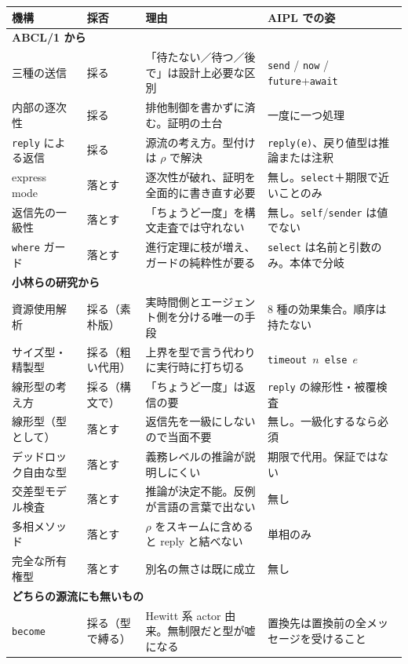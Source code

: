 \documentclass[11pt,a4paper]{ltjsarticle}
\theoremstyle{definition}
\theoremstyle{remark}
\begin{document}
\begin{center}
\small
\begin{longtable}{p{}p{}p{}p{}}
\toprule
機構 & 採否 & 理由 & AIPL での姿 \\
\midrule
\endhead
\multicolumn{4}{l}{\textbf{ABCL/1 から}}\\
\midrule
三種の送信 & 採る & 「待たない／待つ／後で」は設計上必要な区別 &
  \texttt{send} / \texttt{now} / \texttt{future}+\texttt{await} \\
内部の逐次性 & 採る & 排他制御を書かずに済む。証明の土台 & 一度に一つ処理 \\
\texttt{reply} による返信 & 採る & 源流の考え方。型付けは $\rho$ で解決 &
  \texttt{reply(e)}、戻り値型は推論または注釈 \\
\addlinespace
express mode & 落とす & 逐次性が破れ、証明を全面的に書き直す必要 &
  無し。\texttt{select}＋期限で近いことのみ \\
返信先の一級性 & 落とす & 「ちょうど一度」を構文走査では守れない &
  無し。\texttt{self}/\texttt{sender} は値でない \\
\texttt{where} ガード & 落とす & 進行定理に枝が増え、ガードの純粋性が要る &
  \texttt{select} は名前と引数のみ。本体で分岐 \\
\midrule
\multicolumn{4}{l}{\textbf{小林らの研究から}}\\
\midrule
資源使用解析 & 採る（素朴版） & 実時間側とエージェント側を分ける唯一の手段 &
  8 種の効果集合。順序は持たない \\
サイズ型・精製型 & 採る（粗い代用） & 上界を型で言う代わりに実行時に打ち切る &
  \texttt{timeout $n$ else $e$} \\
線形型の考え方 & 採る（構文で） & 「ちょうど一度」は返信の要 &
  \texttt{reply} の線形性・被覆検査 \\
\addlinespace
線形型（型として） & 落とす & 返信先を一級にしないので当面不要 &
  無し。一級化するなら必須 \\
デッドロック自由な型 & 落とす & 義務レベルの推論が説明しにくい &
  期限で代用。保証ではない \\
交差型モデル検査 & 落とす & 推論が決定不能。反例が言語の言葉で出ない & 無し \\
多相メソッド & 落とす & $\rho$ をスキームに含めると reply と結べない & 単相のみ \\
完全な所有権型 & 落とす & 別名の無さは既に成立 & 無し \\
\midrule
\multicolumn{4}{l}{\textbf{どちらの源流にも無いもの}}\\
\midrule
\texttt{become} & 採る（型で縛る） & Hewitt 系 actor 由来。無制限だと型が嘘になる &
  置換先は置換前の全メッセージを受けること \\
\bottomrule
\end{longtable}
\end{center}
\end{document}
